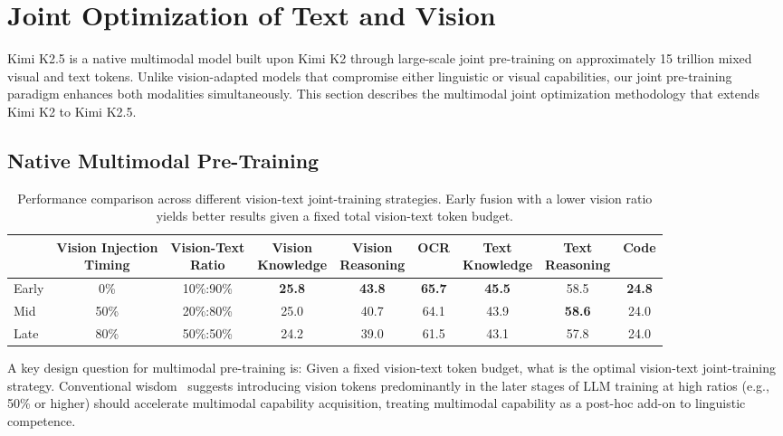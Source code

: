 
\section{Joint Optimization of Text and Vision}


Kimi K2.5 is a native multimodal model built upon Kimi K2 through large-scale joint pre-training on approximately 15 trillion mixed visual and text tokens. Unlike vision-adapted models that compromise either linguistic or visual capabilities, our joint pre-training paradigm enhances both modalities simultaneously. This section describes the multimodal joint optimization methodology that extends Kimi K2 to Kimi K2.5.



\subsection{Native Multimodal Pre-Training} \label{sec:joint-pre}



\begin{table}[h]
\centering
\caption{Performance comparison across different vision-text joint-training strategies. Early fusion with a lower vision ratio yields better results given a fixed total vision-text token budget.}
\begin{tabular}{lcc|cccccc}
\toprule
 & \shortstack{Vision Injection\\Timing} & \shortstack{Vision-Text\\Ratio} & \shortstack{Vision\\Knowledge} & \shortstack{Vision\\Reasoning} & \shortstack{OCR\\~} & \shortstack{Text\\Knowledge} & \shortstack{Text\\Reasoning} & \shortstack{Code\\~} \\
\midrule
Early & 0\% & 10\%:90\% & \textbf{25.8} & \textbf{43.8} & \textbf{65.7} & \textbf{45.5} & 58.5 & \textbf{24.8} \\
Mid   & 50\% & 20\%:80\% & 25.0 & 40.7 & 64.1 & 43.9 & \textbf{58.6} & 24.0 \\
Late  & 80\% & 50\%:50\% & 24.2 & 39.0 & 61.5 & 43.1 & 57.8 & 24.0 \\
\bottomrule
\end{tabular}
\label{tab:joint-train}
\end{table}


A key design question for multimodal pre-training is: Given a fixed vision-text token budget, what is the optimal vision-text joint-training strategy. Conventional wisdom~\citep{bai2025qwen3vltechnicalreport,guo2025seed15vltechnicalreport} suggests introducing vision tokens predominantly in the later stages of LLM training at high ratios (e.g., 50\% or higher) should accelerate multimodal capability acquisition, treating multimodal capability as a post-hoc add-on to linguistic competence.


